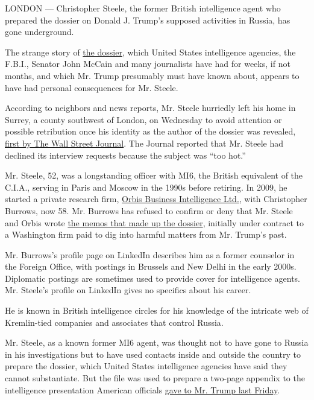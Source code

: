 LONDON --- Christopher Steele, the former British intelligence agent who
prepared the dossier on Donald J. Trump's supposed activities in Russia,
has gone underground.

The strange story of
\href{https://www.nytimes.com/2017/01/11/us/politics/trump-intelligence-report-explainer.html}{the
dossier}, which United States intelligence agencies, the F.B.I., Senator
John McCain and many journalists have had for weeks, if not months, and
which Mr. Trump presumably must have known about, appears to have had
personal consequences for Mr. Steele.

According to neighbors and news reports, Mr. Steele hurriedly left his
home in Surrey, a county southwest of London, on Wednesday to avoid
attention or possible retribution once his identity as the author of the
dossier was revealed,
\href{http://www.wsj.com/articles/christopher-steele-ex-british-intelligence-officer-said-to-have-prepared-dossier-on-trump-1484162553}{first
by The Wall Street Journal}. The Journal reported that Mr. Steele had
declined its interview requests because the subject was ``too hot.''

Mr. Steele, 52, was a longstanding officer with MI6, the British
equivalent of the C.I.A., serving in Paris and Moscow in the 1990s
before retiring. In 2009, he started a private research firm,
\href{https://orbisbi.com/}{Orbis Business Intelligence Ltd.}, with
Christopher Burrows, now 58. Mr. Burrows has refused to confirm or deny
that Mr. Steele and Orbis wrote
\href{https://www.nytimes.com/2017/01/11/us/politics/donald-trump-russia-intelligence.html?hp\&action=click\&pgtype=Homepage\&clickSource=story-heading\&module=a-lede-package-region\&region=top-news\&WT.nav=top-news}{the
memos that made up the dossier}, initially under contract to a
Washington firm paid to dig into harmful matters from Mr. Trump's past.

Mr. Burrows's profile page on LinkedIn describes him as a former
counselor in the Foreign Office, with postings in Brussels and New Delhi
in the early 2000s. Diplomatic postings are sometimes used to provide
cover for intelligence agents. Mr. Steele's profile on LinkedIn gives no
specifics about his career.

He is known in British intelligence circles for his knowledge of the
intricate web of Kremlin-tied companies and associates that control
Russia.

Mr. Steele, as a known former MI6 agent, was thought not to have gone to
Russia in his investigations but to have used contacts inside and
outside the country to prepare the dossier, which United States
intelligence agencies have said they cannot substantiate. But the file
was used to prepare a two-page appendix to the intelligence presentation
American officials
\href{https://www.nytimes.com/2017/01/10/us/politics/donald-trump-russia-intelligence.html?rref=collection\%2Ftimestopic\%2FTrump\%2C\%20Donald\%20J.\&action=click\&contentCollection=timestopics\&region=stream\&module=stream_unit\&version=latest\&contentPlacement=57\&pgtype=collection}{gave
to Mr. Trump last Friday}.

